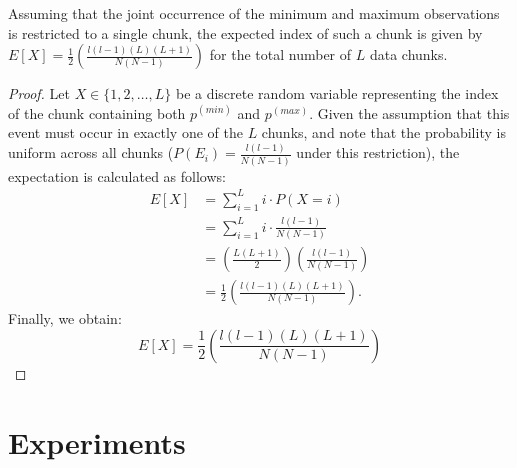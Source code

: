 \documentclass[a4paper,fleqn]{cas-dc}
\begin{document}
\begin{corollary}
Assuming that the joint occurrence of the minimum and maximum observations is restricted to a single chunk, the expected index of such a chunk is given by $E[X] = \frac{1}{2}\left(\frac{l(l-1)(L)(L+1)}{N(N-1)}\right)$ for the total number of $L$ data chunks.
\begin{proof}
Let $X \in \{1, 2, \dots, L\}$ be a discrete random variable representing the index of the chunk containing both $p^{(min)}$ and $p^{(max)}$. Given the assumption that this event must occur in exactly one of the $L$ chunks, and note that the probability is uniform across all chunks ($P(E_i) =\frac{l(l-1)}{N(N-1)}$ under this restriction), the expectation is calculated as follows:
\begin{align*}
E[X] &= \sum_{i=1}^{L} i \cdot P(X = i) \\
     &= \sum_{i=1}^{L} i \cdot \frac{l(l-1)}{N(N-1)} \\
     &= \left( \frac{L(L+1)}{2}\right)\left( \frac{l(l-1)}{N(N-1)}\right)\\
     &= \frac{1}{2}\left(\frac{l(l-1)(L)(L+1)}{N(N-1)}\right).
\end{align*}
Finally, we obtain:
\begin{equation} 
E[X] = \frac{1}{2}\left(\frac{l(l-1)(L)(L+1)}{N(N-1)}\right) 
\end{equation}

\end{proof}
\end{corollary}


\section{Experiments}
\label{experiment}

\end{document}
